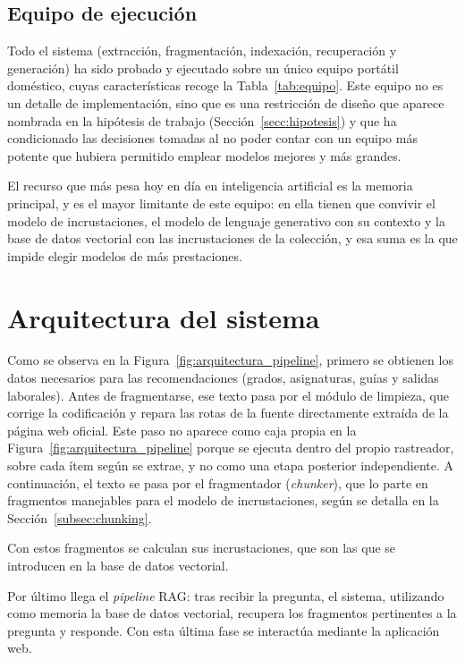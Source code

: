\subsection{Equipo de ejecución}
\label{secc:equipo_ejecucion}

Todo el sistema (extracción, fragmentación, indexación, recuperación
y generación) ha sido probado y ejecutado sobre un único equipo portátil doméstico, cuyas
características recoge la Tabla~\ref{tab:equipo}. Este equipo no es un detalle de implementación, sino que es una restricción de diseño que
aparece nombrada en la hipótesis de trabajo (Sección~\ref{secc:hipotesis}) y que ha condicionado las decisiones tomadas al no poder contar con un equipo más potente que hubiera permitido emplear modelos mejores y más grandes.

El recurso que más pesa hoy en día en inteligencia artificial es la memoria principal, y es el mayor limitante de este equipo: en ella tienen que convivir el modelo de incrustaciones, el modelo de lenguaje generativo con su contexto y la base de datos vectorial con las incrustaciones de la colección, y esa suma es la que impide elegir modelos de más prestaciones.




\section{Arquitectura del sistema}

Como se observa en la Figura~\ref{fig:arquitectura_pipeline}, primero se obtienen los datos necesarios para las recomendaciones (grados, asignaturas, guías y salidas laborales). Antes de fragmentarse, ese texto pasa por el módulo de limpieza, que corrige la codificación y repara las  rotas de la fuente directamente extraída de la página web oficial. Este paso no aparece como caja propia en la Figura~\ref{fig:arquitectura_pipeline} porque se ejecuta dentro del propio rastreador, sobre cada ítem según se extrae, y no como una etapa posterior independiente. A continuación, el texto se pasa por el fragmentador (\textit{chunker}), que lo parte en fragmentos manejables para el modelo de incrustaciones, según se detalla en la Sección~\ref{subsec:chunking}.


Con estos fragmentos se calculan sus incrustaciones, que son las que se introducen en la base de datos vectorial.

Por último llega el \textit{pipeline} RAG: tras recibir la pregunta, el sistema, utilizando como memoria la base de datos vectorial, recupera los fragmentos pertinentes a la pregunta y responde. Con esta última fase se interactúa mediante la aplicación web.

